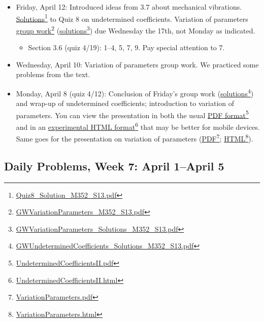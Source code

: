 \begin{itemize}
\item Friday, April 12: Introduced ideas from 3.7 about mechanical vibrations. \href{Quiz8_Solution_M352_S13.pdf}{Solutions}\footnote{\href{Quiz8_Solution_M352_S13.pdf}{Quiz8\_Solution\_M352\_S13.pdf}} to Quiz 8 on undetermined coefficients. Variation of parameters \href{GWVariationParameters_M352_S13.pdf}{group work}\footnote{\href{GWVariationParameters_M352_S13.pdf}{GWVariationParameters\_M352\_S13.pdf}} (\href{GWVariationParameters_Solutions_M352_S13.pdf}{solutions}\footnote{\href{GWVariationParameters_Solutions_M352_S13.pdf}{GWVariationParameters\_Solutions\_M352\_S13.pdf}}) due Wednesday the 17th, not Monday as indicated.

\begin{itemize}
\item Section 3.6 (quiz 4\slash 19): 1--4, 5, 7, 9. Pay special attention to 7.

\end{itemize}

\item Wednesday, April 10: Variation of parameters group work. We practiced some problems from the text.

\item Monday, April 8 (quiz 4\slash 12): Conclusion of Friday's group work (\href{GWUndeterminedCoefficients_Solutions_M352_S13.pdf}{solutions}\footnote{\href{GWUndeterminedCoefficients_Solutions_M352_S13.pdf}{GWUndeterminedCoefficients\_Solutions\_M352\_S13.pdf}}) and wrap-up of undetermined coefficients; introduction to variation of parameters. You can view the presentation in both the usual \href{UndeterminedCoefficientsII.pdf}{PDF format}\footnote{\href{UndeterminedCoefficientsII.pdf}{UndeterminedCoefficientsII.pdf}} and in an \href{UndeterminedCoefficientsII.html}{experimental HTML format}\footnote{\href{UndeterminedCoefficientsII.html}{UndeterminedCoefficientsII.html}} that may be better for mobile devices. Same goes for the presentation on variation of parameters (\href{VariationParameters.pdf}{PDF}\footnote{\href{VariationParameters.pdf}{VariationParameters.pdf}}; \href{VariationParameters.html}{HTML}\footnote{\href{VariationParameters.html}{VariationParameters.html}}).

\end{itemize}

\subsection{Daily Problems, Week 7: April 1--April 5}
\label{dailyproblemsweek7:april1--april5}

